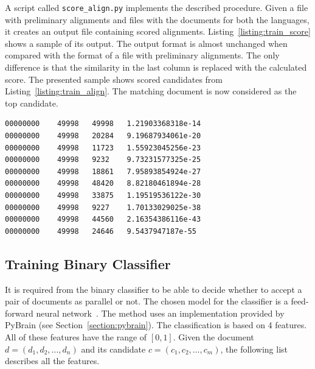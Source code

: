 A script called \texttt{score\_align.py} implements the described procedure. Given a file with preliminary alignments and files with the documents for both the languages, it creates an output file containing scored alignments. Listing~\ref{listing:train_score} shows a sample of its output. The output format is almost unchanged when compared with the format of a file with preliminary alignments. The only difference is that the similarity in the last column is replaced with the calculated score. The presented sample shows scored candidates from Listing~\ref{listing:train_align}. The matching document is now considered as the top candidate.

\begin{lstlisting}[float=!htb,caption={Sample from a file with scored alignments (training)},label={listing:train_score},firstnumber=457311]
00000000	49998	49998	1.21903368318e-14
00000000	49998	20284	9.19687934061e-20
00000000	49998	11723	1.55923045256e-23
00000000	49998	9232	9.73231577325e-25
00000000	49998	18861	7.95893854924e-27
00000000	49998	48420	8.82180461894e-28
00000000	49998	33875	1.19519536122e-30
00000000	49998	9227	1.70133029025e-38
00000000	49998	44560	2.16354386116e-43
00000000	49998	24646	9.5437947187e-55
\end{lstlisting}

\subsection{Training Binary Classifier}
\label{subsection:training_binary_classifier}

It is required from the binary classifier to be able to decide whether to accept a pair of documents as parallel or not. The chosen model for the classifier is a feed-forward neural network~\cite{Sima96}. The method uses an implementation provided by PyBrain (see Section~\ref{section:pybrain}). The classification is based on 4 features. All of these features have the range of $[0, 1]$. Given the document $d=(d_1, d_2, \ldots, d_n)$ and its candidate $c=(c_1, c_2, \ldots, c_m)$, the following list describes all the features.

